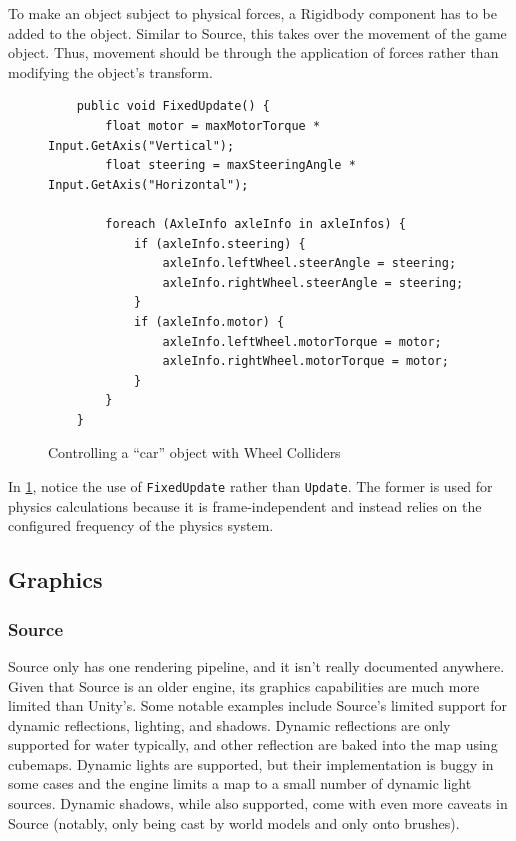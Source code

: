 \documentclass[a4paper, 12pt]{scrartcl}
\begin{document}
To make an object subject to physical forces, a Rigidbody component has to be added to the object. Similar to Source, this takes over the movement of the game object. Thus, movement should be through the application of forces rather than modifying the object's transform.

\begin{figure}[!ht]
  \begin{verbatim}
    public void FixedUpdate() {
        float motor = maxMotorTorque * Input.GetAxis("Vertical");
        float steering = maxSteeringAngle * Input.GetAxis("Horizontal");

        foreach (AxleInfo axleInfo in axleInfos) {
            if (axleInfo.steering) {
                axleInfo.leftWheel.steerAngle = steering;
                axleInfo.rightWheel.steerAngle = steering;
            }
            if (axleInfo.motor) {
                axleInfo.leftWheel.motorTorque = motor;
                axleInfo.rightWheel.motorTorque = motor;
            }
        }
    }
  \end{verbatim}
  \caption{Controlling a ``car'' object with Wheel Colliders}
  \label{fig:unity_wheels}
\end{figure}

In \cref{fig:unity_wheels}, notice the use of \texttt{FixedUpdate} rather than \texttt{Update}. The former is used for physics calculations because it is frame-independent and instead relies on the configured frequency of the physics system.

\subsection{Graphics}
\subsubsection{Source}
Source only has one rendering pipeline, and it isn't really documented anywhere. Given that Source is an older engine, its graphics capabilities are much more limited than Unity's. Some notable examples include Source's limited support for dynamic reflections, lighting, and shadows. Dynamic reflections are only supported for water typically, and other reflection are baked into the map using cubemaps. Dynamic lights are supported, but their implementation is buggy in some cases and the engine limits a map to a small number of dynamic light sources. Dynamic shadows, while also supported, come with even more caveats in Source (notably, only being cast by world models and only onto brushes).
\end{document}
